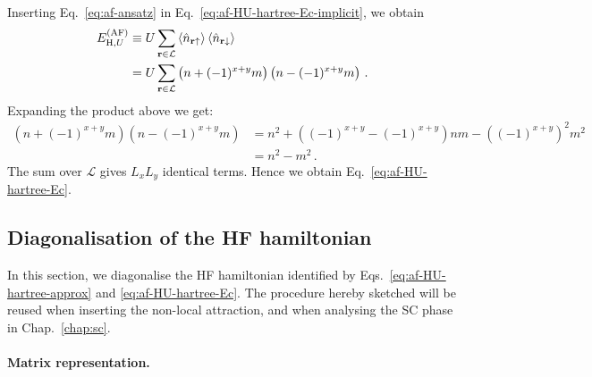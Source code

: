 \begin{tabproof}
	
	Inserting Eq.~\eqref{eq:af-ansatz} in Eq.~\eqref{eq:af-HU-hartree-Ec-implicit}, we obtain
	\[
	\begin{aligned}
		E_{\mathrm{H},U}^{(\mathrm{AF})} &\equiv U \sum_{\mathbf{r}\in\mathcal{L}} \ev{\hat n_{\mathbf{r}\uparrow}} \ev{\hat n_{\mathbf{r}\downarrow}} \\
		&= U \sum_{\mathbf{r}\in\mathcal{L}} \left(
		n + (-1)^{x+y} m
		\right) \left(
		n - (-1)^{x+y} m
		\right) \, .
	\end{aligned}
	\]
	Expanding the product above we get:
	\[
	\begin{aligned}
		\left(
		n + (-1)^{x+y} m
		\right) \left(
		n - (-1)^{x+y} m
		\right) &= n^2 + \left(
		(-1)^{x+y} - (-1)^{x+y}
		\right)nm - \left((-1)^{x+y}\right)^2 m^2 \\
		&= n^2 - m^2 \, .
	\end{aligned}
	\]
	The sum over $\mathcal{L}$ gives $L_x L_y$ identical terms. Hence we obtain Eq.~\eqref{eq:af-HU-hartree-Ec}.
\end{tabproof}

\subsection{Diagonalisation of the HF hamiltonian}\label{subsec:af-hm-diagonalisation}

In this section, we diagonalise the HF hamiltonian identified by Eqs.~\eqref{eq:af-HU-hartree-approx} and \eqref{eq:af-HU-hartree-Ec}. The procedure hereby sketched will be reused when inserting the non-local attraction, and when analysing the SC phase in Chap.~\ref{chap:sc}.

\paragraph{Matrix representation.}

